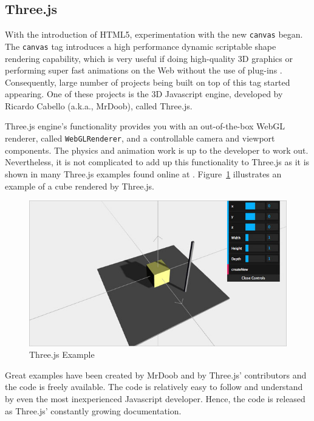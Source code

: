 \subsection{Three.js}

With the introduction of HTML5, experimentation with the new \texttt{canvas} began. The \texttt{canvas} tag introduces a high performance dynamic scriptable shape rendering capability, which is very useful if doing high-quality 3D graphics or performing super fast animations on the Web without the use of plug-ins \cite{wiki:webgl}. Consequently, large number of projects being built on top of this tag started appearing. One of these projects is the 3D Javascript engine, developed by Ricardo Cabello (a.k.a., MrDoob), called Three.js.  

Three.js engine's functionality provides you with an out-of-the-box WebGL renderer, called \texttt{WebGLRenderer}, and a controllable camera and viewport components. The physics and animation work is up to the developer to work out. Nevertheless, it is not complicated to add up this functionality to Three.js as it is shown in many Three.js examples found online at \cite{threeJS}. Figure~\ref{fig:threejs} illustrates an example of a cube rendered by Three.js.

\begin{figure}
	\center
	\includegraphics[scale=0.45]{images/basicsThreeJS.png}
	\caption{Three.js Example}
	\label{fig:threejs}
\end{figure}


Great examples have been created by MrDoob and by Three.js' contributors and the code is freely available. The code is relatively easy to follow and understand by even the most inexperienced Javascript developer. Hence, the code is released as Three.js' constantly growing documentation. 

